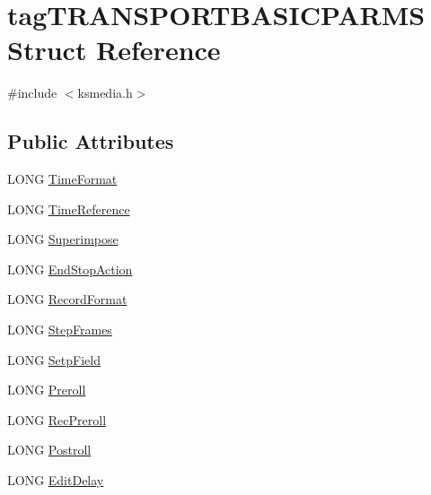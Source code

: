 \hypertarget{structtag_t_r_a_n_s_p_o_r_t_b_a_s_i_c_p_a_r_m_s}{}\section{tag\+T\+R\+A\+N\+S\+P\+O\+R\+T\+B\+A\+S\+I\+C\+P\+A\+R\+MS Struct Reference}
\label{structtag_t_r_a_n_s_p_o_r_t_b_a_s_i_c_p_a_r_m_s}


{\ttfamily \#include $<$ksmedia.\+h$>$}

\subsection*{Public Attributes}
\begin{DoxyCompactItemize}
\item 
L\+O\+NG \hyperlink{structtag_t_r_a_n_s_p_o_r_t_b_a_s_i_c_p_a_r_m_s_a13df1fcd10f3d56e4fa526e6de1e02e9}{Time\+Format}
\item 
L\+O\+NG \hyperlink{structtag_t_r_a_n_s_p_o_r_t_b_a_s_i_c_p_a_r_m_s_aa08b1783e4af78cf7515336fa19d9c4f}{Time\+Reference}
\item 
L\+O\+NG \hyperlink{structtag_t_r_a_n_s_p_o_r_t_b_a_s_i_c_p_a_r_m_s_a13ed6e6957066e73e960ac12b053bcc6}{Superimpose}
\item 
L\+O\+NG \hyperlink{structtag_t_r_a_n_s_p_o_r_t_b_a_s_i_c_p_a_r_m_s_af7ee74924edc860b5318da2826fb0a86}{End\+Stop\+Action}
\item 
L\+O\+NG \hyperlink{structtag_t_r_a_n_s_p_o_r_t_b_a_s_i_c_p_a_r_m_s_aeff099cdf839d5c08b9aae93fcd15944}{Record\+Format}
\item 
L\+O\+NG \hyperlink{structtag_t_r_a_n_s_p_o_r_t_b_a_s_i_c_p_a_r_m_s_a75260f1d4d6b45c690bda744459f0872}{Step\+Frames}
\item 
L\+O\+NG \hyperlink{structtag_t_r_a_n_s_p_o_r_t_b_a_s_i_c_p_a_r_m_s_a939e1618f1295102f3b1ec578c35b6af}{Setp\+Field}
\item 
L\+O\+NG \hyperlink{structtag_t_r_a_n_s_p_o_r_t_b_a_s_i_c_p_a_r_m_s_a9f77301cf520fa08f97b70a93943bec6}{Preroll}
\item 
L\+O\+NG \hyperlink{structtag_t_r_a_n_s_p_o_r_t_b_a_s_i_c_p_a_r_m_s_a3cf0132c8ae405041b69b86cf163de02}{Rec\+Preroll}
\item 
L\+O\+NG \hyperlink{structtag_t_r_a_n_s_p_o_r_t_b_a_s_i_c_p_a_r_m_s_af1dd60cbfbf99f7fc19893be0a35fbfd}{Postroll}
\item 
L\+O\+NG \hyperlink{structtag_t_r_a_n_s_p_o_r_t_b_a_s_i_c_p_a_r_m_s_a405af5e5db0f567095819dcacfe6e191}{Edit\+Delay}

\end{DoxyCompactItemize}
